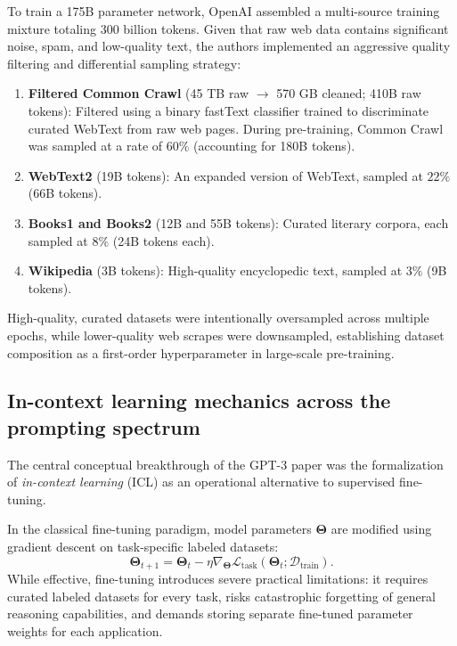 \documentclass[../../../main.tex]{subfiles}
\begin{document}
To train a 175B parameter network, OpenAI assembled a multi-source training mixture totaling 300 billion tokens. Given that raw web data contains significant noise, spam, and low-quality text, the authors implemented an aggressive quality filtering and differential sampling strategy:
\begin{enumerate}
    \item \textbf{Filtered Common Crawl} (45 TB raw $\to$ 570 GB cleaned; 410B raw tokens): Filtered using a binary fastText classifier trained to discriminate curated WebText from raw web pages. During pre-training, Common Crawl was sampled at a rate of $60\%$ (accounting for 180B tokens).
    \item \textbf{WebText2} (19B tokens): An expanded version of WebText, sampled at $22\%$ (66B tokens).
    \item \textbf{Books1 and Books2} (12B and 55B tokens): Curated literary corpora, each sampled at $8\%$ (24B tokens each).
    \item \textbf{Wikipedia} (3B tokens): High-quality encyclopedic text, sampled at $3\%$ (9B tokens).
\end{enumerate}
High-quality, curated datasets were intentionally oversampled across multiple epochs, while lower-quality web scrapes were downsampled, establishing dataset composition as a first-order hyperparameter in large-scale pre-training.


\subsection{In-context learning mechanics across the prompting spectrum}
\label{subsec:gpt3_icl_mechanics}

The central conceptual breakthrough of the GPT-3 paper was the formalization of \emph{in-context learning} (ICL) as an operational alternative to supervised fine-tuning.

In the classical fine-tuning paradigm, model parameters $\boldsymbol{\Theta}$ are modified using gradient descent on task-specific labeled datasets:
\begin{equation}
\boldsymbol{\Theta}_{t+1} = \boldsymbol{\Theta}_t - \eta \nabla_{\boldsymbol{\Theta}} \mathcal{L}_{\text{task}}(\boldsymbol{\Theta}_t; \mathcal{D}_{\text{train}}).
\label{eq:finetuning_update}
\end{equation}
While effective, fine-tuning introduces severe practical limitations: it requires curated labeled datasets for every task, risks catastrophic forgetting of general reasoning capabilities, and demands storing separate fine-tuned parameter weights for each application.
\end{document}
